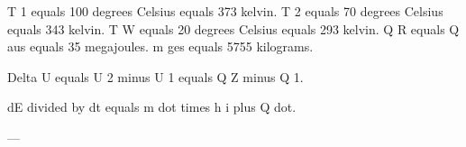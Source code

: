 T 1 equals 100 degrees Celsius equals 373 kelvin.  
T 2 equals 70 degrees Celsius equals 343 kelvin.  
T W equals 20 degrees Celsius equals 293 kelvin.  
Q R equals Q aus equals 35 megajoules.  
m ges equals 5755 kilograms.  

Delta U equals U 2 minus U 1 equals Q Z minus Q 1.  

dE divided by dt equals m dot times h i plus Q dot.  

---